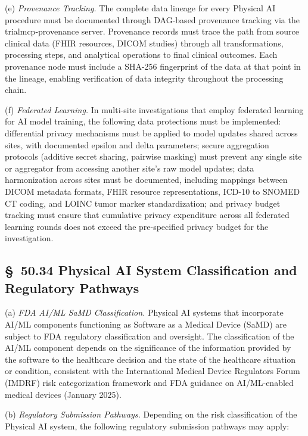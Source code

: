 \documentclass[11pt]{article}
\begin{document}
(e) \textit{Provenance Tracking.} The complete data lineage for every Physical AI procedure must be documented through DAG-based provenance tracking via the trialmcp-provenance server. Provenance records must trace the path from source clinical data (FHIR resources, DICOM studies) through all transformations, processing steps, and analytical operations to final clinical outcomes. Each provenance node must include a SHA-256 fingerprint of the data at that point in the lineage, enabling verification of data integrity throughout the processing chain.

(f) \textit{Federated Learning.} In multi-site investigations that employ federated learning for AI model training, the following data protections must be implemented: differential privacy mechanisms must be applied to model updates shared across sites, with documented epsilon and delta parameters; secure aggregation protocols (additive secret sharing, pairwise masking) must prevent any single site or aggregator from accessing another site's raw model updates; data harmonization across sites must be documented, including mappings between DICOM metadata formats, FHIR resource representations, ICD-10 to SNOMED CT coding, and LOINC tumor marker standardization; and privacy budget tracking must ensure that cumulative privacy expenditure across all federated learning rounds does not exceed the pre-specified privacy budget for the investigation.

\subsection{\S~50.34 Physical AI System Classification and Regulatory Pathways}

(a) \textit{FDA AI/ML SaMD Classification.} Physical AI systems that incorporate AI/ML components functioning as Software as a Medical Device (SaMD) are subject to FDA regulatory classification and oversight. The classification of the AI/ML component depends on the significance of the information provided by the software to the healthcare decision and the state of the healthcare situation or condition, consistent with the International Medical Device Regulators Forum (IMDRF) risk categorization framework and FDA guidance on AI/ML-enabled medical devices (January 2025).

(b) \textit{Regulatory Submission Pathways.} Depending on the risk classification of the Physical AI system, the following regulatory submission pathways may apply:
\end{document}
